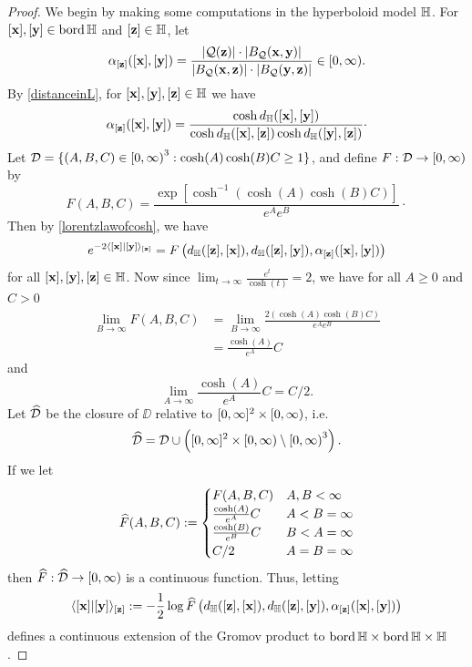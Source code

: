 \begin{proof}
We begin by making some computations in the hyperboloid model $\H$. For $[\xx],[\yy]\in\bord\H$ and $[\zz]\in\H$, let
\[
\alpha_{[\mathbf z]}([\mathbf x],[\mathbf y]) = \frac{|\mathcal Q(\mathbf z)|\cdot |B_\mathcal Q(\mathbf x,\mathbf y)|}{|B_\mathcal Q(\mathbf x,\mathbf z)|\cdot |B_\mathcal Q(\mathbf y,\mathbf z)|}\in{[0,\infty)}.
\]
By \eqref{distanceinL}, for $[\xx],[\yy],[\zz]\in\H$ we have
\begin{equation}
\label{lorentzlawofcosh}
\alpha_{[\zz]}([\xx],[\yy]) = \frac{\cosh\dist_\H([\xx],[\yy])}{\cosh\dist_\H([\xx],[\zz])\cosh\dist_\H([\yy],[\zz])}\cdot
\end{equation}
Let $\mathcal D = \{(A,B,C)\in{[0,\infty)}^3: \cosh(A)\cosh(B)C \geq 1\}$, and define $F: \mathcal D\to{[0,\infty)}$ by
\[
F(A,B,C) = \frac{\exp\left[\cosh^{-1}\left(\cosh(A)\cosh(B)C\right)\right]}{e^A e^B}\cdot
\]
Then by \eqref{lorentzlawofcosh}, we have
\[
e^{-2\lb [\xx]|[\yy]\rb_{[\zz]}} = F\left(\dist_\H([\zz],[\xx]),\dist_\H([\zz],[\yy]),\alpha_{[\zz]}([\xx],[\yy])\right)
\]
for all $[\xx],[\yy],[\zz]\in\H$. Now since $\lim_{t\to\infty}\frac{e^t}{\cosh(t)} = 2$, we have for all $A\geq 0$ and $C > 0$
\begin{align*}
\lim_{B\to\infty}F(A,B,C)
&= \lim_{B\to\infty}\frac{2\left(\cosh(A)\cosh(B)C\right)}{e^A e^B}\\
&= \frac{\cosh(A)}{e^A} C
\end{align*}
and 
\[
\lim_{A\to\infty}\frac{\cosh(A)}{e^A} C
= C/2.
\]
Let $\widehat {\mathcal D}$ be the closure of $\DD$ relative to $[0,\infty]^2\times {[0,\infty)}$, i.e. 
\[
\widehat {\mathcal D} = \mathcal D\cup \left([0,\infty]^2\times {[0,\infty)}\setminus {[0,\infty)}^3\right).
\] 
If we let
\[
\widehat F(A,B,C) :=
\begin{cases}
F(A,B,C) & A,B < \infty\\
\frac{\cosh(A)}{e^A} C & A < B = \infty\\
\frac{\cosh(B)}{e^B} C & B < A = \infty\\
C/2 & A = B = \infty
\end{cases}
\]
then $\widehat F: \widehat {\mathcal D}\to{[0,\infty)}$ is a continuous function. Thus, letting
\[
\lb [\xx]|[\yy]\rb_{[\zz]} := -\frac12\log\what F\left(\dist_\H([\zz],[\xx]),\dist_\H([\zz],[\yy]),\alpha_{[\zz]}([\xx],[\yy])\right)
\]
defines a continuous extension of the Gromov product to $\bord\H\times\bord\H\times\H$.


\end{proof}
